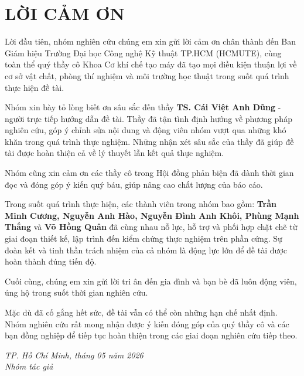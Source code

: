 
\chapter*{LỜI CẢM ƠN}

\begingroup
  \fontsize{13pt}{16.9pt}\selectfont
  \setlength{\parskip}{6pt}
  \setlength{\parindent}{1.5em}

  Lời đầu tiên, nhóm nghiên cứu chúng em xin gửi lời cảm ơn chân thành đến Ban Giám hiệu
  Trường Đại học Công nghệ Kỹ thuật TP.HCM (HCMUTE), cùng toàn thể quý thầy cô
  Khoa Cơ khí chế tạo máy đã tạo mọi điều kiện thuận lợi về cơ sở vật chất, phòng
  thí nghiệm và môi trường học thuật trong suốt quá trình thực hiện đề tài.

  Nhóm xin bày tỏ lòng biết ơn sâu sắc đến thầy \textbf{TS. Cái Việt Anh Dũng} -
  người trực tiếp hướng dẫn đề tài. Thầy đã tận tình định hướng về phương pháp
  nghiên cứu, góp ý chỉnh sửa nội dung và động viên nhóm vượt qua những khó khăn
  trong quá trình thực nghiệm. Những nhận xét sâu sắc của thầy đã giúp đề tài
  được hoàn thiện cả về lý thuyết lẫn kết quả thực nghiệm.

  Nhóm cũng xin cảm ơn các thầy cô trong Hội đồng phản biện đã dành thời gian
  đọc và đóng góp ý kiến quý báu, giúp nâng cao chất lượng của báo cáo.

  Trong suốt quá trình thực hiện, các thành viên trong nhóm bao gồm:
  \textbf{Trần Minh Cương, Nguyễn Anh Hào, Nguyễn Đình Anh Khôi, Phùng Mạnh Thắng}
  và \textbf{Võ Hồng Quân} đã cùng nhau nỗ lực, hỗ trợ và phối hợp chặt chẽ
  từ giai đoạn thiết kế, lập trình đến kiểm chứng thực nghiệm trên phần cứng. Sự
  đoàn kết và tinh thần trách nhiệm của cả nhóm là động lực lớn để đề tài được
  hoàn thành đúng tiến độ.

  Cuối cùng, chúng em xin gửi lời tri ân đến gia đình và bạn bè đã luôn động viên,
  ủng hộ trong suốt thời gian nghiên cứu.

  \noindent Mặc dù đã cố gắng hết sức, đề tài vẫn có thể còn những hạn chế nhất
  định. Nhóm nghiên cứu rất mong nhận được ý kiến đóng góp của quý thầy cô và
  các bạn đồng nghiệp để tiếp tục hoàn thiện trong các giai đoạn nghiên cứu
  tiếp theo.

  \vspace{1cm}
  \begin{flushright}
    \textit{TP. Hồ Chí Minh, tháng 05 năm 2026}\\[0.3cm]
    \textit{Nhóm tác giả}
  \end{flushright}

\endgroup
